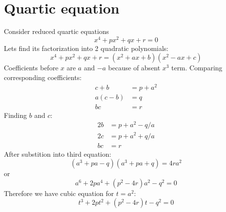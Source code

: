 \documentclass[a4paper, 12pt]{article}
\begin{document}
\section{Quartic equation}
Consider reduced quartic equations
\[
x^4+px^2+qx+r=0
\]
Lets find its factorization into 2 quadratic polynomials:
\[
    x^4+px^2+qx+r=(x^2+ax+b)(x^2-ax+c)
\]
Coefficients before $x$ are $a$ and $-a$ because of absent $x^3$ term.
Comparing corresponding coefficients:
\begin{align*}
    c+b &=p+a^2\\
    a(c-b) &=q\\
    bc &= r
\end{align*} 
Finding $b$ and $c$:
\begin{align*}
    2b &= p+a^2-q/a\\
    2c &= p+a^2+q/a\\
    bc &= r
\end{align*}
After substition into third equation:
\[
    (a^3+pa-q)(a^3+pa+q)=4ra^2    
\]
or
\[
    a^6+2pa^4+(p^2-4r)a^2-q^2=0
\]
Therefore we have cubic equation for $t=a^2$:
\[
t^3+2pt^2+(p^2-4r)t-q^2=0    
\]
\end{document}
